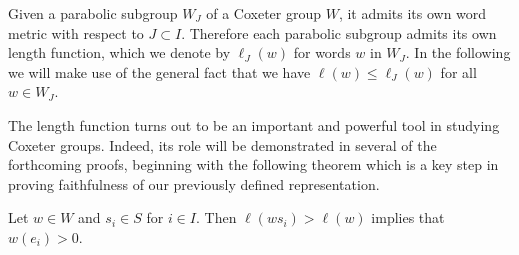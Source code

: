 Given a parabolic subgroup \(W_J\) of a Coxeter group \(W\), it admits its own word metric with respect to \(J\subset I\).
Therefore each parabolic subgroup admits its own length function, which we denote by \(\ell_J(w)\) for words \(w\) in \(W_J\).
In the following we will make use of the general fact that we have \(\ell(w) \leq \ell_J(w)\) for all \(w\in W_J\).

The length function turns out to be an important and powerful tool in studying Coxeter groups.
Indeed, its role will be demonstrated in several of the forthcoming proofs, beginning with the following theorem which is a key step in proving faithfulness of our previously defined representation.
\begin{theorem}\label{thm:action}
    Let \(w\in W\) and \(s_i\in S\) for \(i\in I\).
    Then \(\ell(ws_i) > \ell(w)\) implies that \(w(e_i) > 0\).
\end{theorem}

